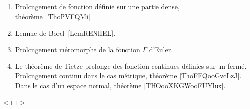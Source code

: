 
\begin{enumerate}
	\item Prolongement de fonction définie sur une partie dense, théorème~\ref{ThoPVFQMi}
	\item Lemme de Borel~\ref{LemRENlIEL}.
	\item Prolongement méromorphe de la fonction \( \Gamma\) d'Euler.
    \item Le théorème de Tietze prolonge des fonction continues définies sur un fermé. Prolongement continu dans le cas métrique, théorème \ref{ThoFFQooGvcLzJ}. Dans le cas d'un espace normal, théorème \ref{THOooXKGWooFUYlux}.
\end{enumerate}
<++>
